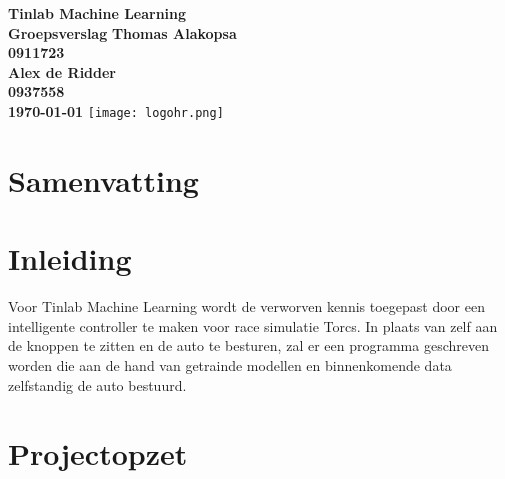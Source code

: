 \documentclass{article}
\begin{document}
\sffamily
\begin{titlepage}
  \centering
    \vfill
    {\bfseries\Huge
      Tinlab Machine Learning \\
      Groepsverslag
        \vskip2cm
      }
      {\bfseries\Large
      	Thomas Alakopsa\\
      	{ \bfseries\normalsize
      	0911723\\
      	}
      }
      {\bfseries\Large
      	Alex de Ridder\\
      	{ \bfseries\normalsize
      	0937558\\
      	}
      }
      {
        \bfseries\normalsize
        \vskip2cm
        \today
    }    
    \vfill
    \texttt{[image: logohr.png]}
    \vfill
    \vfill
\end{titlepage}
\newpage

\section{Samenvatting}



\section{Inleiding}
Voor Tinlab Machine Learning wordt de verworven kennis toegepast door een intelligente controller te maken voor race simulatie Torcs. In plaats van zelf aan de knoppen te zitten en de auto te besturen, zal er een programma geschreven worden die aan de hand van getrainde modellen en binnenkomende data zelfstandig de auto bestuurd. 


\section{Projectopzet}


\end{document}
